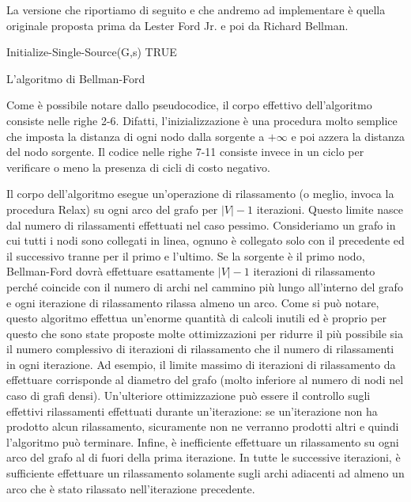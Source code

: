 \documentclass[12pt,a4paper]{book} %
\begin{document}
	La versione che riportiamo di seguito e che andremo ad implementare è quella originale proposta prima da Lester Ford Jr. e poi da Richard Bellman.
	
	\begin{algorithm}[H]
		\label{alg:bf}
		Initialize-Single-Source(G,s)\;
		\Return TRUE\;
		\caption{L'algoritmo di Bellman-Ford}
	\end{algorithm}

	Come è possibile notare dallo pseudocodice, il corpo effettivo dell'algoritmo consiste nelle righe 2-6. Difatti, l'inizializzazione è una procedura molto semplice che imposta la distanza di ogni nodo dalla sorgente a $+\infty$ e poi azzera la distanza del nodo sorgente. Il codice nelle righe 7-11 consiste invece in un ciclo per verificare o meno la presenza di cicli di costo negativo.
	
	Il corpo dell'algoritmo esegue un'operazione di rilassamento (o meglio, invoca la procedura Relax) su ogni arco del grafo per $|V|-1$ iterazioni. Questo limite nasce dal numero di rilassamenti effettuati nel caso pessimo. Consideriamo un grafo in cui tutti i nodi sono collegati in linea, ognuno è collegato solo con il precedente ed il successivo tranne per il primo e l'ultimo. Se la sorgente è il primo nodo, Bellman-Ford dovrà effettuare esattamente $|V|-1$ iterazioni di rilassamento perché coincide con il numero di archi nel cammino più lungo all'interno del grafo e ogni iterazione di rilassamento rilassa almeno un arco. Come si può notare, questo algoritmo effettua un'enorme quantità di calcoli inutili ed è proprio per questo che sono state proposte molte ottimizzazioni per ridurre il più possibile sia il numero complessivo di iterazioni di rilassamento che il numero di rilassamenti in ogni iterazione. Ad esempio, il limite massimo di iterazioni di rilassamento da effettuare corrisponde al diametro del grafo (molto inferiore al numero di nodi nel caso di grafi densi). Un'ulteriore ottimizzazione può essere il controllo sugli effettivi rilassamenti effettuati durante un'iterazione: se un'iterazione non ha prodotto alcun rilassamento, sicuramente non ne verranno prodotti altri e quindi l'algoritmo può terminare. Infine, è inefficiente effettuare un rilassamento su ogni arco del grafo al di fuori della prima iterazione. In tutte le successive iterazioni, è sufficiente effettuare un rilassamento solamente sugli archi adiacenti ad almeno un arco che è stato rilassato nell'iterazione precedente.
	
\end{document}
